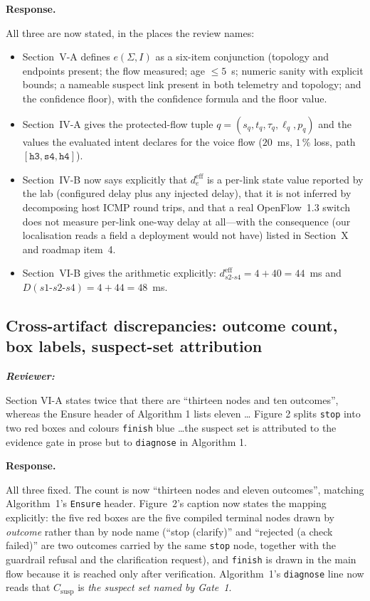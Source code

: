 \documentclass[11pt,a4paper]{article}
\newenvironment{reviewer}{\par\medskip\noindent\begin{minipage}{\linewidth}\small\itshape\color{quote}\textbf{Reviewer:}\par}{\end{minipage}\medskip\par}
\newenvironment{response}{\par\noindent\begin{minipage}{\linewidth}\small\textbf{Response.}\par}{\end{minipage}\medskip\par}
\begin{document}
\begin{response}
All three are now stated, in the places the review names:

\begin{itemize}
  \item Section~V-A defines $e(\Sigma,I)$ as a six-item conjunction
    (topology and endpoints present; the flow measured; age $\le 5$~s;
    numeric sanity with explicit bounds; a nameable suspect link present in
    both telemetry and topology; and the confidence floor), with the
    confidence formula and the floor value.
  \item Section~IV-A gives the protected-flow tuple
    $q=(s_q,t_q,\tau_q,\ell_q,p_q)$ and the values the evaluated intent
    declares for the voice flow ($20$~ms, $1\,\%$ loss, path
    $[\texttt{h3},\texttt{s4},\texttt{h4}]$).
  \item Section~IV-B now says explicitly that $d^{\mathrm{eff}}_e$ is a
    per-link state value reported by the lab (configured delay plus any
    injected delay), that it is not inferred by decomposing host ICMP round
    trips, and that a real OpenFlow~1.3 switch does not measure per-link
    one-way delay at all---with the consequence (our localisation reads a
    field a deployment would not have) listed in Section~X and roadmap
    item~4.
  \item Section~VI-B gives the arithmetic explicitly:
    $d^{\mathrm{eff}}_{s2\text{-}s4}=4+40=44$~ms and
    $D(s1\text{-}s2\text{-}s4)=4+44=48$~ms.
\end{itemize}
\end{response}

\subsection{Cross-artifact discrepancies: outcome count, box labels,
suspect-set attribution}

\begin{reviewer}
Section VI-A states twice that there are ``thirteen nodes and ten
outcomes'', whereas the Ensure header of Algorithm 1 lists eleven \dots
Figure 2 splits \texttt{stop} into two red boxes and colours \texttt{finish}
blue \dots the suspect set is attributed to the evidence gate in prose but
to \texttt{diagnose} in Algorithm 1.
\end{reviewer}

\begin{response}
All three fixed. The count is now ``thirteen nodes and eleven
outcomes'', matching Algorithm~1's \texttt{Ensure} header. Figure~2's
caption now states the mapping explicitly: the five red boxes are the five
compiled terminal nodes drawn by \emph{outcome} rather than by node name
(``stop (clarify)'' and ``rejected (a check failed)'' are two outcomes
carried by the same \texttt{stop} node, together with the guardrail refusal
and the clarification request), and \texttt{finish} is drawn in the main
flow because it is reached only after verification. Algorithm~1's
\texttt{diagnose} line now reads that $C_{\mathrm{susp}}$ is
\emph{the suspect set named by Gate~1}.
\end{response}
\end{document}
